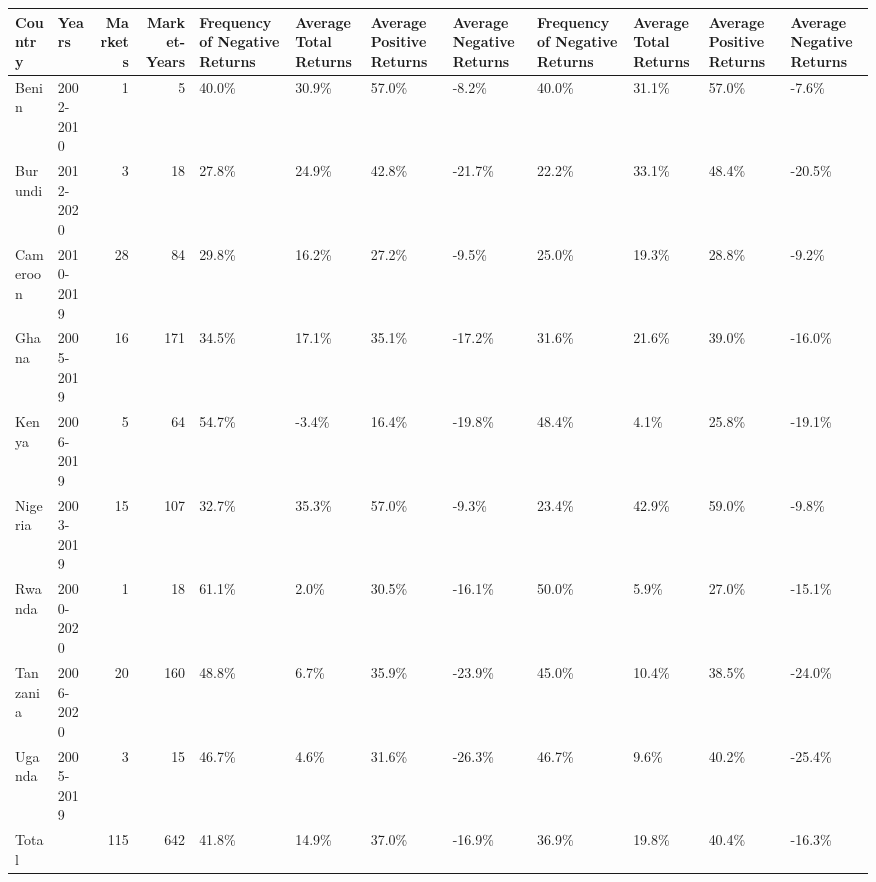 \begin{table}[ht]
\centering
\begin{tabular}{llrrllllllll}
  \hline
Country & Years & Markets & Market-Years & Frequency of Negative Returns & Average Total Returns & Average Positive Returns & Average Negative Returns & Frequency of Negative Returns & Average Total Returns & Average Positive Returns & Average Negative Returns \\ 
  \hline
Benin & 2002-2010 &   1 &   5 & 40.0\% & 30.9\% & 57.0\% & -8.2\% & 40.0\% & 31.1\% & 57.0\% & -7.6\% \\ 
  Burundi & 2012-2020 &   3 &  18 & 27.8\% & 24.9\% & 42.8\% & -21.7\% & 22.2\% & 33.1\% & 48.4\% & -20.5\% \\ 
  Cameroon & 2010-2019 &  28 &  84 & 29.8\% & 16.2\% & 27.2\% & -9.5\% & 25.0\% & 19.3\% & 28.8\% & -9.2\% \\ 
  Ghana & 2005-2019 &  16 & 171 & 34.5\% & 17.1\% & 35.1\% & -17.2\% & 31.6\% & 21.6\% & 39.0\% & -16.0\% \\ 
  Kenya & 2006-2019 &   5 &  64 & 54.7\% & -3.4\% & 16.4\% & -19.8\% & 48.4\% & 4.1\% & 25.8\% & -19.1\% \\ 
  Nigeria & 2003-2019 &  15 & 107 & 32.7\% & 35.3\% & 57.0\% & -9.3\% & 23.4\% & 42.9\% & 59.0\% & -9.8\% \\ 
  Rwanda & 2000-2020 &   1 &  18 & 61.1\% & 2.0\% & 30.5\% & -16.1\% & 50.0\% & 5.9\% & 27.0\% & -15.1\% \\ 
  Tanzania & 2006-2020 &  20 & 160 & 48.8\% & 6.7\% & 35.9\% & -23.9\% & 45.0\% & 10.4\% & 38.5\% & -24.0\% \\ 
  Uganda & 2005-2019 &   3 &  15 & 46.7\% & 4.6\% & 31.6\% & -26.3\% & 46.7\% & 9.6\% & 40.2\% & -25.4\% \\ 
  Total &   & 115 & 642 & 41.8\% & 14.9\% & 37.0\% & -16.9\% & 36.9\% & 19.8\% & 40.4\% & -16.3\% \\ 
   \hline
\end{tabular}
\end{table}
